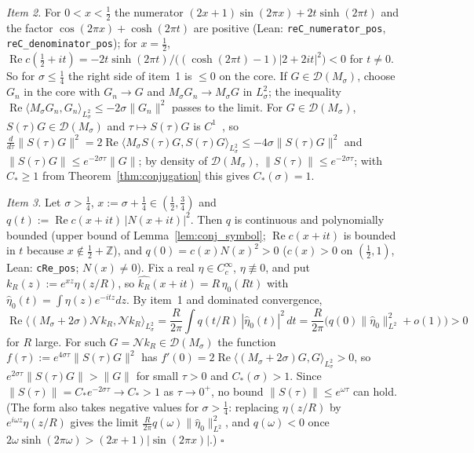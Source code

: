 \documentclass[11pt,a4paper]{article}
\begin{document}
\emph{Item 2.}  For $0<x<\tfrac12$ the numerator $(2x+1)\sin(2\pi x)+2t\sinh(2\pi t)$ and the factor
$\cos(2\pi x)+\cosh(2\pi t)$ are positive (Lean: \texttt{reC\_numerator\_pos}, \texttt{reC\_denominator\_pos}); for $x=\tfrac12$,
$\operatorname{Re}c(\tfrac12+it)=-2t\sinh(2\pi t)/\bigl((\cosh(2\pi t)-1)|2+2it|^2\bigr)<0$ for $t\ne0$.  So for $\sigma\le\tfrac14$ the right side of
item~1 is $\le0$ on the core.  If $G\in\mathcal{D}(M_\sigma)$, choose $G_n$ in the core with $G_n\to G$ and $M_\sigma G_n\to M_\sigma G$ in
$L^2_\sigma$; the inequality $\operatorname{Re}\langle M_\sigma G_n,G_n\rangle_{L^2_\sigma}\le-2\sigma\|G_n\|^2$ passes to the limit.  For
$G\in\mathcal{D}(M_\sigma)$, $S(\tau)G\in\mathcal{D}(M_\sigma)$ and $\tau\mapsto S(\tau)G$ is $C^1$~\cite[Lemma~II.1.3]{engelnagel2000}, so
$\frac{d}{d\tau}\|S(\tau)G\|^2=2\operatorname{Re}\langle M_\sigma S(\tau)G,S(\tau)G\rangle_{L^2_\sigma}\le-4\sigma\|S(\tau)G\|^2$ and
$\|S(\tau)G\|\le e^{-2\sigma\tau}\|G\|$; by density of $\mathcal{D}(M_\sigma)$,
$\|S(\tau)\|\le e^{-2\sigma\tau}$; with $C_*\ge1$ from Theorem~\ref{thm:conjugation} this gives $C_*(\sigma)=1$.

\emph{Item 3.}  Let $\sigma>\tfrac14$, $x:=\sigma+\tfrac14\in(\tfrac12,\tfrac34)$ and $q(t):=\operatorname{Re}c(x+it)\,|N(x+it)|^2$.  Then $q$ is
continuous and polynomially bounded (upper bound of Lemma~\ref{lem:conj_symbol}; $\operatorname{Re}c(x+it)$ is bounded in $t$ because
$x\notin\tfrac12+\mathbb{Z}$), and $q(0)=c(x)N(x)^2>0$ ($c(x)>0$ on $(\tfrac12,1)$, Lean: \texttt{cRe\_pos}; $N(x)\ne0$).
Fix a real $\eta\in C_c^\infty$, $\eta\not\equiv0$, and put $k_R(z):=e^{xz}\eta(z/R)$, so $\widehat{k_R}(x+it)=R\,\widehat{\eta}_0(Rt)$ with
$\widehat{\eta}_0(t)=\int\eta(z)e^{-itz}dz$.  By item~1 and dominated convergence,
\[
\operatorname{Re}\langle(M_\sigma+2\sigma)\mathcal{N}k_R,\mathcal{N}k_R\rangle_{L^2_\sigma}
=\frac{R}{2\pi}\int q(t/R)\,|\widehat{\eta}_0(t)|^2\,dt=\frac{R}{2\pi}\bigl(q(0)\|\widehat{\eta}_0\|_{L^2}^2+o(1)\bigr)>0
\]
for $R$ large.  For such $G=\mathcal{N}k_R\in\mathcal{D}(M_\sigma)$ the function $f(\tau):=e^{4\sigma\tau}\|S(\tau)G\|^2$ has
$f'(0)=2\operatorname{Re}\langle(M_\sigma+2\sigma)G,G\rangle_{L^2_\sigma}>0$, so $e^{2\sigma\tau}\|S(\tau)G\|>\|G\|$ for small $\tau>0$ and $C_*(\sigma)>1$.
Since $\|S(\tau)\|=C_*e^{-2\sigma\tau}\to C_*>1$ as $\tau\to0^+$, no bound $\|S(\tau)\|\le e^{\omega\tau}$ can hold.
(The form also takes negative values for $\sigma>\tfrac14$: replacing $\eta(z/R)$ by $e^{i\omega z}\eta(z/R)$ gives the limit
$\frac{R}{2\pi}q(\omega)\|\widehat{\eta}_0\|^2_{L^2}$, and $q(\omega)<0$ once $2\omega\sinh(2\pi\omega)>(2x+1)|\sin(2\pi x)|$.) \hfill$\square$
\end{document}
